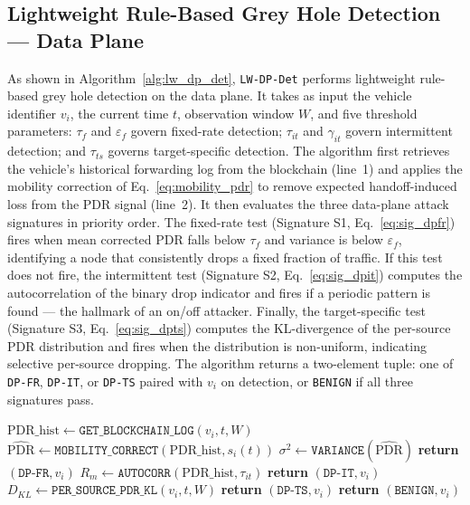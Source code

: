 \documentclass[12pt, a4paper]{report}
\begin{document}
\subsection{Lightweight Rule-Based Grey Hole Detection — Data Plane}

As shown in Algorithm~\ref{alg:lw_dp_det}, \texttt{LW-DP-Det} performs lightweight rule-based grey hole detection on the data plane. It takes as input the vehicle
identifier $v_i$, the current time $t$, observation window $W$, and five
threshold parameters: $\tau_f$ and $\varepsilon_f$ govern fixed-rate detection;
$\tau_{it}$ and $\gamma_{it}$ govern intermittent detection; and $\tau_{ts}$
governs target-specific detection. The algorithm first retrieves the vehicle's
historical forwarding log from the blockchain (line~1) and applies the mobility
correction of Eq.~\eqref{eq:mobility_pdr} to remove expected handoff-induced
loss from the PDR signal (line~2). It then evaluates the three data-plane attack
signatures in priority order. The fixed-rate test (Signature S1,
Eq.~\eqref{eq:sig_dpfr}) fires when mean corrected PDR falls below $\tau_f$ and
variance is below $\varepsilon_f$, identifying a node that consistently drops a
fixed fraction of traffic. If this test does not fire, the intermittent test
(Signature S2, Eq.~\eqref{eq:sig_dpit}) computes the autocorrelation of the
binary drop indicator and fires if a periodic pattern is found — the hallmark of
an on/off attacker. Finally, the target-specific test (Signature S3,
Eq.~\eqref{eq:sig_dpts}) computes the KL-divergence of the per-source PDR
distribution and fires when the distribution is non-uniform, indicating
selective per-source dropping. The algorithm returns a two-element tuple: one
of \texttt{DP-FR}, \texttt{DP-IT}, or \texttt{DP-TS} paired with $v_i$ on
detection, or \texttt{BENIGN} if all three signatures pass.

\begin{algorithm}[htb]
\caption{Lightweight Rule-Based Grey Hole Detection — Data Plane (\texttt{LW-DP-Det})}
\begin{algorithmic}[1]
\small
{}
  \State $\text{PDR\_hist} \gets \texttt{GET\_BLOCKCHAIN\_LOG}(v_i, t, W)$
  \State $\widehat{\text{PDR}} \gets \texttt{MOBILITY\_CORRECT}(\text{PDR\_hist}, s_i(t))$
  \State $\sigma^2 \gets \texttt{VARIANCE}(\widehat{\text{PDR}})$
    \State \textbf{return} $(\texttt{DP-FR}, v_i)$
  \EndIf
  \State $R_{m} \gets \texttt{AUTOCORR}(\text{PDR\_hist}, \tau_{it})$
    \State \textbf{return} $(\texttt{DP-IT}, v_i)$
  \EndIf
  \State $D_{KL} \gets \texttt{PER\_SOURCE\_PDR\_KL}(v_i, t, W)$
    \State \textbf{return} $(\texttt{DP-TS}, v_i)$
  \EndIf
  \State \textbf{return} $(\texttt{BENIGN}, v_i)$
\EndProcedure
\end{algorithmic}
\label{alg:lw_dp_det}
\end{algorithm}
\end{document}
